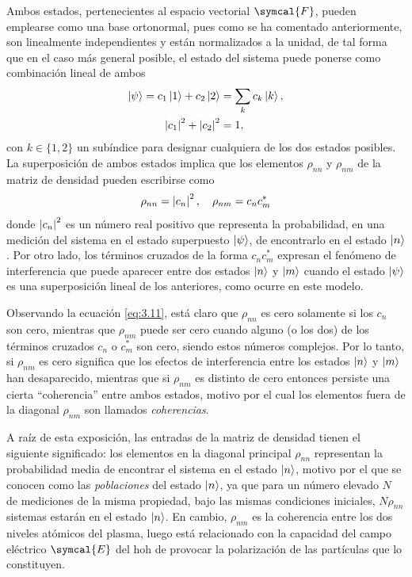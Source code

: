 Ambos estados, pertenecientes al espacio vectorial $\symcal{F}$, pueden emplearse como una base ortonormal, pues como se ha comentado anteriormente, son linealmente independientes y están normalizados a la unidad, de tal forma que en el caso más general posible, el estado del sistema puede ponerse como combinación lineal de ambos
\begin{align}
  \left|\psi\right\rangle = c_{1}\left|1\right\rangle + c_{2}\left|2\right\rangle &= \sum_{k} c_{k}\left|k\right\rangle, \\
  \left|c_{1}\right|^{2} + \left|c_{2}\right|^{2} &= 1,
\end{align}
con $k \in \{1,2\}$ un subíndice para designar cualquiera de los dos estados posibles. La superposición de ambos estados implica que los elementos $\rho_{nn}$ y $\rho_{nm}$ de la matriz de densidad pueden escribirse como
\begin{equation}\label{eq:3.11}
  \rho_{nn} = \left|c_{n}\right|^{2}, \quad 
  \rho_{nm} = c_{n}c^{*}_{m}
\end{equation}
donde $\left|c_{n}\right|^{2}$ es un número real positivo que representa la probabilidad, en una medición del sistema en el estado superpuesto $\left|\psi\right\rangle$, de encontrarlo en el estado $\left|n\right\rangle$. Por otro lado, los términos cruzados de la forma $c_{n}c^{*}_{m}$ expresan el fenómeno de interferencia que puede aparecer entre dos estados $\left|n\right\rangle$ y $\left|m\right\rangle$ cuando el estado $\left|\psi\right\rangle$ es una superposición lineal de los anteriores, como ocurre en este modelo. 

Observando la ecuación \eqref{eq:3.11}, está claro que $\rho_{nn}$ es cero solamente si los $c_{n}$ son cero, mientras que $\rho_{nm}$ puede ser cero cuando alguno (o los dos) de los términos cruzados $c_{n}$ o $c^{*}_{m}$ son cero, siendo estos números complejos. Por lo tanto, si $\rho_{nm}$ es cero significa que los efectos de interferencia entre los estados $\left|n\right\rangle$ y $\left|m\right\rangle$ han desaparecido, mientras que si $\rho_{nm}$ es distinto de cero entonces persiste una cierta \enquote{coherencia} entre ambos estados, motivo por el cual los elementos fuera de la diagonal $\rho_{nm}$ son llamados \emph{coherencias}.

A raíz de esta exposición, las entradas de la matriz de densidad tienen el siguiente significado: los elementos en la diagonal principal $\rho_{nn}$ representan la probabilidad media de encontrar el sistema en el estado $\left|n\right\rangle$, motivo por el que se conocen como las \emph{poblaciones} del estado $\left|n\right\rangle$, ya que para un número elevado $N$ de mediciones de la misma propiedad, bajo las mismas condiciones iniciales, $N \rho_{nn}$ sistemas estarán en el estado $\left|n\right\rangle$. En cambio, $\rho_{nm}$ es la coherencia entre los dos niveles atómicos del plasma, luego está relacionado con la capacidad del campo eléctrico $\symcal{E}$ del \acrshort{hoh} de provocar la polarización de las partículas que lo constituyen.

